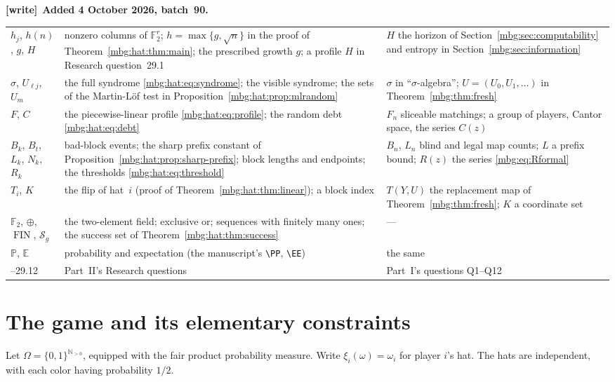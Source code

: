 \documentclass[11pt,letterpaper]{article}
\theoremstyle{definition}
\newcommand{\N}{\mathbb N}
\newcommand{\E}{\mathbb E}
\newcommand{\Prb}{\mathbb P}
\newcommand{\F}{\mathbb F}
\newcommand{\xor}{\mathbin{\oplus}}
\newcommand{\FIN}{\operatorname{FIN}}
\newenvironment{writenote}[1][]{\par\smallskip\begingroup\small
 \noindent\textbf{[write]}\if\relax\detokenize{#1}\relax\else~\textbf{#1.}\fi\ }%
 {\par\endgroup\smallskip}
\begin{document}
\begin{writenote}[Added 4 October 2026, batch~90]
\begin{longtable}{>{\raggedright\arraybackslash}p{}>{\raggedright\arraybackslash}p{}>{\raggedright\arraybackslash}p{}}
$h_j$, $h(n)$, $g$, $H$ & nonzero columns of $\F_2^r$; $h=\max\{g,\sqrt n\}$ in the proof of Theorem~\ref{mbg:hat:thm:main}; the prescribed growth $g$; a profile $H$ in Research question~29.1 & $H$ the horizon of Section~\ref{mbg:sec:computability} and entropy in Section~\ref{mbg:sec:information}\\
$\sigma$, $U_{\ell j}$, $U_m$ & the full syndrome \eqref{mbg:hat:eq:syndrome}; the visible syndrome; the sets of the Martin-L\"of test in Proposition~\ref{mbg:hat:prop:mlrandom} & $\sigma$ in ``$\sigma$-algebra''; $U=(U_0,U_1,\ldots)$ in Theorem~\ref{mbg:thm:fresh}\\
$F$, $C$ & the piecewise-linear profile \eqref{mbg:hat:eq:profile}; the random debt \eqref{mbg:hat:eq:debt} & $F_n$ sliceable matchings; a group of players, Cantor space, the series $C(z)$\\
$B_k$, $B_t$, $L_k$, $N_k$, $R_k$ & bad-block events; the sharp prefix constant of Proposition~\ref{mbg:hat:prop:sharp-prefix}; block lengths and endpoints; the thresholds \eqref{mbg:hat:eq:threshold} & $B_n$, $L_n$ blind and legal map counts; $L$ a prefix bound; $R(z)$ the series \eqref{mbg:eq:Rformal}\\
$T_i$, $K$ & the flip of hat~$i$ (proof of Theorem~\ref{mbg:hat:thm:linear}); a block index & $T(Y,U)$ the replacement map of Theorem~\ref{mbg:thm:fresh}; $K$ a coordinate set\\
$\F_2$, $\xor$, $\FIN$, $\mathcal S_g$ & the two-element field; exclusive or; sequences with finitely many ones; the success set of Theorem~\ref{mbg:hat:thm:success} & ---\\
$\Prb$, $\E$ & probability and expectation (the manuscript's \texttt{\textbackslash PP}, \texttt{\textbackslash EE}) & the same\\
29.1--29.12 & Part~II's Research questions & Part~I's questions Q1--Q12\\
\bottomrule
\end{longtable}
\end{writenote}

\section{The game and its elementary constraints}
\label{mbg:hat:sec:game}

Let \(\Omega=\{0,1\}^{\N_{>0}}\), equipped with the fair product
probability measure. Write \(\xi_i(\omega)=\omega_i\) for player \(i\)'s
hat. The hats are independent, with each color having probability
\(1/2\).
\end{document}
